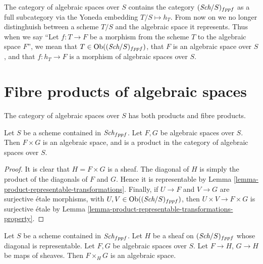 \noindent
The category of algebraic spaces over $S$ contains the category
$(\textit{Sch}/S)_{fppf}$ as a full subcategory via the
Yoneda embedding $T/S \mapsto h_T$. From now on we no longer distinghuish
between a scheme $T/S$ and the algebraic space it represents.
Thus when we say ``Let $f : T \to F$ be a morphism from the scheme
$T$ to the algebraic space $F$'', we mean that
$T \in \mathop{\rm Ob}\nolimits((\textit{Sch}/S)_{fppf})$, that $F$ is an
algebraic space over $S$, and that $f : h_T \to F$ is a morphism
of algebraic spaces over $S$.






\section{Fibre products of algebraic spaces}
\label{section-fibre-products}

\noindent
The category of algebraic spaces over $S$ has both products and
fibre products.

\begin{lemma}
\label{lemma-product-spaces}
Let $S$ be a scheme contained in $\textit{Sch}_{fppf}$.
Let $F, G$ be algebraic spaces over $S$.
Then $F \times G$ is an algebraic space, and is a product
in the category of algebraic spaces over $S$.
\end{lemma}

\begin{proof}
It is clear that $H = F \times G$ is a sheaf.
The diagonal of $H$ is simply the product of the
diagonals of $F$ and $G$. Hence it is representable by
Lemma \ref{lemma-product-representable-transformations}.
Finally, if $U \to F$ and $V \to G$ are surjective
\'etale morphisms, with $U, V \in \mathop{\rm Ob}\nolimits((\textit{Sch}/S)_{fppf})$,
then $U \times V \to F \times G$ is surjective \'etale
by Lemma \ref{lemma-product-representable-transformations-property}.
\end{proof}

\begin{lemma}
\label{lemma-fibre-product-spaces-over-sheaf-with-representable-diagonal}
Let $S$ be a scheme contained in $\textit{Sch}_{fppf}$.
Let $H$ be a sheaf on $(\textit{Sch}/S)_{fppf}$ whose diagonal
is representable. Let $F, G$ be algebraic spaces over $S$.
Let $F \to H$, $G \to H$ be maps of sheaves.
Then $F \times_H G$ is an algebraic space.
\end{lemma}

